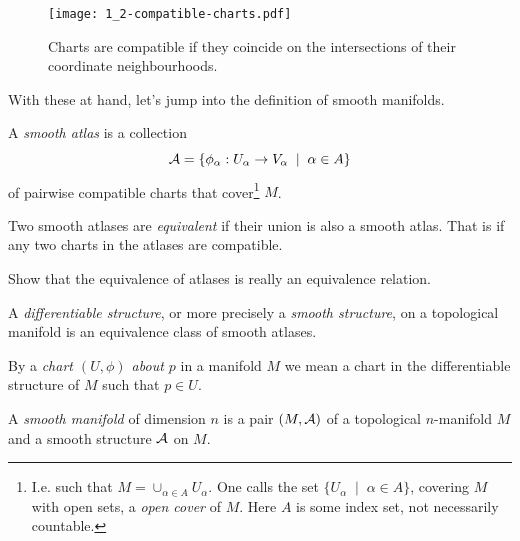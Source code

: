 \begin{figure}[htp]
  \centering
  \texttt{[image: 1\_2-compatible-charts.pdf]}
  \caption{Charts are compatible if they coincide on the intersections of their coordinate neighbourhoods.}
  \label{fig:1.2-compatible-charts}
\end{figure}

With these at hand, let's jump into the definition of smooth manifolds.

\begin{definition}\label{def:cratlas}
  A \emph{smooth atlas} is a collection
  \begin{equation}
    \mathcal{A} = \{\phi_\alpha: U_\alpha \to V_\alpha \;\mid\; \alpha\in A\}
  \end{equation}
  of pairwise compatible charts that cover\footnote{I.e. such that $M = \cup_{\alpha\in A} U_\alpha$. One calls the set $\{U_\alpha \;\mid\; \alpha\in A\}$, covering $M$ with open sets, a \emph{open cover} of $M$. Here $A$ is some index set, not necessarily countable.} $M$.

  Two smooth atlases are \emph{equivalent} if their union is also a smooth atlas. That is if any two charts in the atlases are compatible.
\end{definition}

\begin{exercise}
  Show that the equivalence of atlases is really an equivalence relation.
\end{exercise}

\begin{definition}\label{def:diffstr}
  A \emph{differentiable structure}, or more precisely a \emph{smooth structure}, on a topological manifold is an equivalence class of smooth atlases.
\end{definition}

\begin{notation}
By a \emph{chart $(U, \phi)$ about $p$} in a manifold $M$ we mean a chart in the differentiable structure of $M$ such that $p\in U$.
\end{notation}

\begin{definition}\label{def:diffmanifold}
  A \emph{smooth manifold} of dimension $n$ is a pair $(M, \mathcal{A})$ of a topological $n$-manifold $M$ and a smooth structure $\mathcal{A}$ on $M$.
\end{definition}

